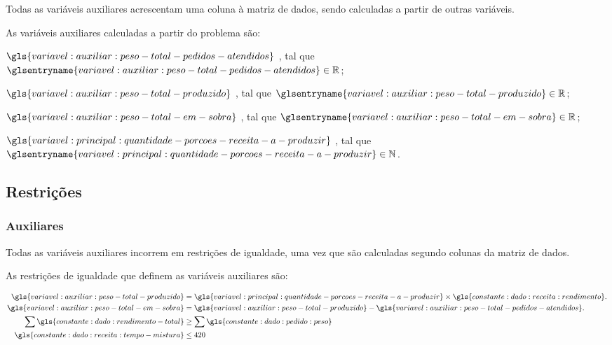 
Todas as variáveis auxiliares acrescentam uma coluna à matriz de dados, sendo calculadas a partir de outras variáveis.

As variáveis auxiliares calculadas a partir do problema são:

\begin{symbols}
    \item[\( \gls{variavel:auxiliar:peso-total-pedidos-atendidos} \)]
    ,
    tal que \( \glsentryname{variavel:auxiliar:peso-total-pedidos-atendidos} \in \mathbb{R} \);

    \item[\( \gls{variavel:auxiliar:peso-total-produzido} \)]
    ,
    tal que \( \glsentryname{variavel:auxiliar:peso-total-produzido} \in \mathbb{R} \);

    \item[\( \gls{variavel:auxiliar:peso-total-em-sobra} \)]
    ,
    tal que \( \glsentryname{variavel:auxiliar:peso-total-em-sobra} \in \mathbb{R} \);
\end{symbols}


\begin{symbols}
    \item[\( \gls{variavel:principal:quantidade-porcoes-receita-a-produzir} \)]
    ,
    tal que \( \glsentryname{variavel:principal:quantidade-porcoes-receita-a-produzir} \in \mathbb{N} \).
\end{symbols}

\subsection{Restrições}

\subsubsection{Auxiliares}

Todas as variáveis auxiliares incorrem em restrições de igualdade, uma vez que são calculadas segundo colunas da matriz de dados.

As restrições de igualdade que definem as variáveis auxiliares são:

\begin{align}
    \gls{variavel:auxiliar:peso-total-produzido} &
    = \gls{variavel:principal:quantidade-porcoes-receita-a-produzir} \times \gls{constante:dado:receita:rendimento}.
    \\
    \gls{variavel:auxiliar:peso-total-em-sobra}  &
    = \gls{variavel:auxiliar:peso-total-produzido} - \gls{variavel:auxiliar:peso-total-pedidos-atendidos}.
    \\
    \sum \gls{constante:dado:rendimento-total}   &
    \geq
    \sum \gls{constante:dado:pedido:peso}
    \\
    \gls{constante:dado:receita:tempo-mistura}   &
    \leq 420
\end{align}

